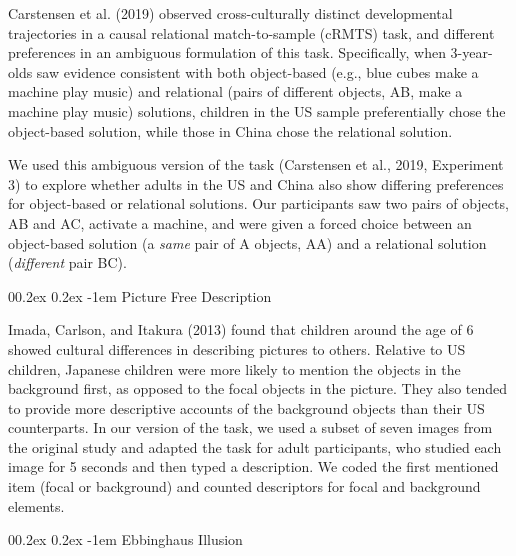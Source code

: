 \documentclass[
  man,floatsintext]{apa6}
\makeatletter
\let\oldparagraph\paragraph
\renewcommand{\paragraph}[1]{\oldparagraph{#1}\mbox{}}
\renewcommand{\paragraph}{\@startsection{paragraph}{4}{\parindent}%
  {0\baselineskip \@plus 0.2ex \@minus 0.2ex}%
  {-1em}%
  {\normalfont\normalsize\bfseries\itshape\typesectitle}}
\makeatother
\begin{document}
Carstensen et al. (2019) observed cross-culturally distinct developmental trajectories in a causal relational match-to-sample (cRMTS) task, and different preferences in an ambiguous formulation of this task. Specifically, when 3-year-olds saw evidence consistent with both object-based (e.g., blue cubes make a machine play music) and relational (pairs of different objects, AB, make a machine play music) solutions, children in the US sample preferentially chose the object-based solution, while those in China chose the relational solution.

We used this ambiguous version of the task (Carstensen et al., 2019, Experiment 3) to explore whether adults in the US and China also show differing preferences for object-based or relational solutions. Our participants saw two pairs of objects, AB and AC, activate a machine, and were given a forced choice between an object-based solution (a \emph{same} pair of A objects, AA) and a relational solution (\emph{different} pair BC).

\hypertarget{picture-free-description}{%
\paragraph{Picture Free Description}\label{picture-free-description}}

Imada, Carlson, and Itakura (2013) found that children around the age of 6 showed cultural differences in describing pictures to others. Relative to US children, Japanese children were more likely to mention the objects in the background first, as opposed to the focal objects in the picture. They also tended to provide more descriptive accounts of the background objects than their US counterparts. In our version of the task, we used a subset of seven images from the original study and adapted the task for adult participants, who studied each image for 5 seconds and then typed a description. We coded the first mentioned item (focal or background) and counted descriptors for focal and background elements.

\hypertarget{ebbinghaus-illusion}{%
\paragraph{Ebbinghaus Illusion}\label{ebbinghaus-illusion}}
\end{document}
